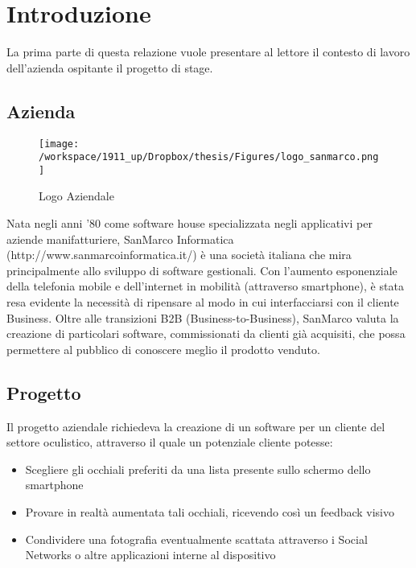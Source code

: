 
\chapter{Introduzione} %

\label{Chapter1} %


La prima parte di questa relazione vuole presentare al lettore il contesto di lavoro dell'azienda ospitante il progetto di stage.



\section{Azienda}
\begin{figure}[h]\centering  
\texttt{[image: /workspace/1911\_up/Dropbox/thesis/Figures/logo\_sanmarco.png]}
\caption[Logo Aziendale]{Logo Aziendale}
\label{pic-a}
\end{figure}

Nata negli anni '80 come software house specializzata negli applicativi per aziende manifatturiere, SanMarco Informatica (http://www.sanmarcoinformatica.it/) è una società italiana che mira principalmente allo sviluppo di software gestionali. Con l'aumento esponenziale della telefonia mobile e dell'internet in mobilità (attraverso smartphone), è stata resa evidente la necessità di ripensare al modo in cui interfacciarsi con il cliente Business. Oltre alle transizioni B2B (Business-to-Business), SanMarco valuta la creazione di particolari software, commissionati da clienti già acquisiti, che possa permettere al pubblico di conoscere meglio il prodotto venduto. 

\section{Progetto}


Il progetto aziendale richiedeva la creazione di un software per un cliente del settore oculistico, attraverso il quale un potenziale cliente potesse:

\begin{itemize}
\item Scegliere gli occhiali preferiti da una lista presente sullo schermo dello smartphone
\item Provare in realtà aumentata tali occhiali, ricevendo così un feedback visivo
\item Condividere una fotografia eventualmente scattata attraverso i Social Networks o altre applicazioni interne al dispositivo 
\end{itemize}

